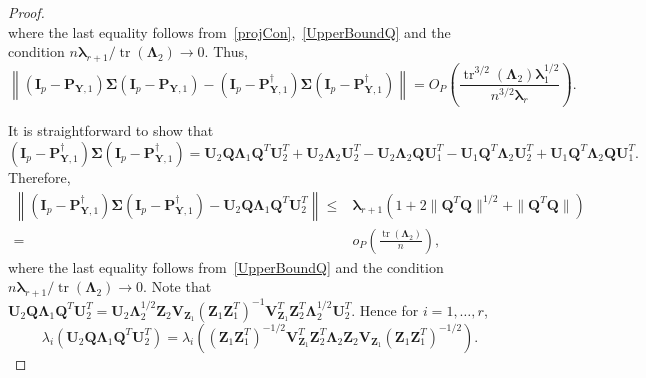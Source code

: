 \documentclass[12pt]{article} %
\DeclareMathOperator{\mytr}{tr}
\newcommand{\bQ}{\mathbf{Q}}
\newcommand{\bZ}{\mathbf{Z}}
\newcommand{\bP}{\mathbf{P}}
\newcommand{\bY}{\mathbf{Y}}
\newcommand{\bI}{\mathbf{I}}
\newcommand{\bU}{\mathbf{U}}
\newcommand{\bV}{\mathbf{V}}
\newcommand{\bfsym}[1]{\ensuremath{\boldsymbol{#1}}}
\def\blambda {\bfsym {\lambda}}
\def\bLambda {\bfsym {\Lambda}}
\def\bSigma {\bfsym {\Sigma}}
\theoremstyle{definition}
\begin{document}
\begin{appendices}
\begin{proof}
\begin{equation*}
\end{equation*}
where the last equality follows from~\eqref{projCon},~\eqref{UpperBoundQ} and the condition $n\blambda_{r+1}/\mytr(\bLambda_2)\to 0$.
Thus,
         \begin{equation*}
         \left\|
         (\bI_p-\bP_{\bY,1})
         \bSigma 
         (\bI_p-\bP_{\bY,1})
         -
         (\bI_p-\bP_{\bY,1}^{\dagger})
         \bSigma 
         (\bI_p-\bP_{\bY,1}^{\dagger})
         \right\|
         = 
         O_P\left(\frac{\mytr^{3/2}(\bLambda_2)\blambda_1^{1/2}}{n^{3/2}\blambda_r}\right)
         .
         \end{equation*}

         It is straightforward to show that
         \begin{equation*}
         (\bI_p-\bP_{\bY,1}^{\dagger})
         \bSigma 
         (\bI_p-\bP_{\bY,1}^{\dagger})
             =
             \bU_2\bQ \bLambda_1 \bQ^T \bU_2^T 
             +\bU_2\bLambda_2  \bU_2^T
             -\bU_2 \bLambda_2 \bQ \bU_1^T
             -\bU_1 \bQ^T \bLambda_2 \bU_2^T
             +\bU_1 \bQ^T \bLambda_2 \bQ \bU_1^T.
         \end{equation*}
         Therefore,
         \begin{equation*}
             \begin{split}
         \left\|
         (\bI_p-\bP_{\bY,1}^{\dagger})
         \bSigma 
         (\bI_p-\bP_{\bY,1}^{\dagger})
             -
             \bU_2 \bQ \bLambda_1 \bQ^T  \bU_2^T
             \right\|
             \leq &
             \blambda_{r+1}(1+2\|\bQ^T \bQ\|^{1/2}+\|\bQ^T \bQ\|)
             \\
             = &
             o_P\left(\frac{\mytr(\bLambda_2)}{n}\right)
             ,
             \end{split}
         \end{equation*}
         where the last equality follows from~\eqref{UpperBoundQ} and the condition $n\blambda_{r+1}/\mytr(\bLambda_2)\to 0$.
         Note that
         $
             \bU_2\bQ \bLambda_1 \bQ^T\bU_2^T
             =
             \bU_2 \bLambda_2^{1/2} \bZ_2 \bV_{\bZ_1} (\bZ_1 \bZ_1^T)^{-1}\bV_{\bZ_1}^T \bZ_2^T \bLambda_2^{1/2} \bU_2^T$. 
             Hence for $i=1,\ldots, r$,
\begin{equation*}
    \lambda_i(\bU_2\bQ \bLambda_1 \bQ^T\bU_2^T)
             =
              \lambda_i\left(
                  (\bZ_1 \bZ_1^T)^{-1/2}\bV_{\bZ_1}^T \bZ_2^T \bLambda_2 \bZ_2 \bV_{\bZ_1}(\bZ_1 \bZ_1^T)^{-1/2}
              \right).
\end{equation*}




\end{proof}
\end{appendices}
\end{document}
